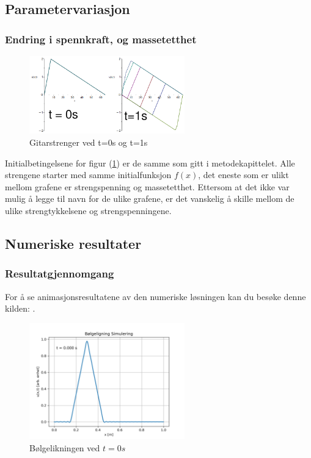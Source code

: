 \subsection{Parametervariasjon}
\subsubsection{Endring i spennkraft, og massetetthet}

\begin{figure}[H]
	\centering
	\includegraphics[width=0.6\textwidth]{figurer/MapleSimulering0sog1s.png}
	\caption{Gitarstrenger ved t=0s og t=1s}
	\label{fig:mapleSim0sog1s}
\end{figure}

Initialbetingelsene for figur (\ref{fig:mapleSim0sog1s}) er de samme som gitt i metodekapittelet. Alle 
strengene starter med samme initialfunksjon $f(x)$, det eneste som er ulikt mellom grafene er strengspenning
og massetetthet. Ettersom at det ikke var mulig å legge til navn for de ulike grafene, er det vanskelig å
skille mellom de ulike strengtykkelsene og strengspenningene. 

\subsection{Numeriske resultater}
\subsubsection{Resultatgjennomgang}
For å se animasjonsresultatene av den numeriske løsningen kan du besøke denne kilden: \parencite{simuleringVideo}.

\begin{figure}[H]
	\centering
	\includegraphics[width=0.6\textwidth]{figurer/bolgeligning_t0.png}
	\caption{Bølgelikningen ved $t=0s$}
	\label{fig:BolgelikningVedT0}
\end{figure}

